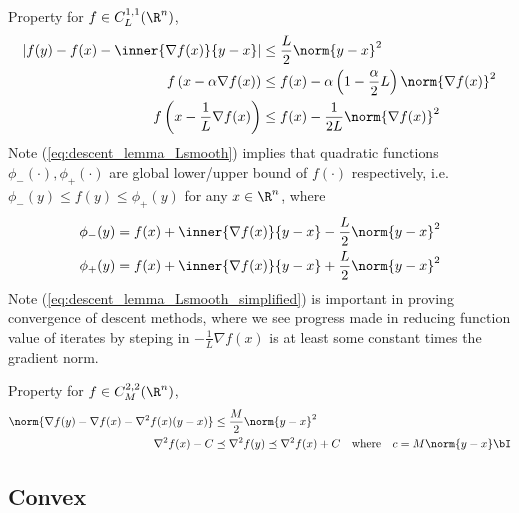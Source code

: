 \documentclass[../summary.tex]{subfiles}
\begin{document}
\noindent Property for $f\in C_L^{1,1}(\R^n)$, 
\begin{align}
    \left| 
        f(y) - f(x) - \inner{\nabla f(x)}{y-x}  \right|
        &\leq \frac{L}{2} \norm{y-x}^2
        \label{eq:descent_lemma_Lsmooth} \\
    f\left( x - \alpha \nabla f(x) \right)
        &\leq f(x) - \alpha\left( 1 - \frac{\alpha}{2}L\right) \norm{\nabla f(x)}^2 \\ 
    f\left( x - \frac{1}{L} \nabla f(x) \right)
        &\leq f(x) - \frac{1}{2L}\norm{\nabla f(x)}^2
        \label{eq:descent_lemma_Lsmooth_simplified}
\end{align}
Note (\ref{eq:descent_lemma_Lsmooth}) implies that quadratic functions $\phi_{-}(\cdot),\phi_+(\cdot)$ are global lower/upper bound of $f(\cdot)$ respectively, i.e. $\phi_{-}(y) \leq f(y) \leq \phi_+(y)$ for any $x\in\R^n$, where
\begin{align*}
    \phi_{-}(y)
        &= f(x) + \inner{\nabla f(x)}{y-x} - \frac{L}{2} \norm{y-x}^2 \\
    \phi_+(y)
        &= f(x) + \inner{\nabla f(x)}{y-x} + \frac{L}{2} \norm{y-x}^2
\end{align*} 
Note (\ref{eq:descent_lemma_Lsmooth_simplified}) is important in proving convergence of descent methods, where we see progress made in reducing function value of iterates by steping in $-\frac{1}{L}\nabla f(x)$ is at least some constant times the gradient norm.

\noindent Property for $f\in C_{M}^{2,2}(\R^n)$,
\begin{align}
    \norm{\nabla f(y) - \nabla f(x) - \nabla^2 f(x)(y-x)}
        &\leq \frac{M}{2} \norm{y-x}^2 \\
    \nabla^2 f(x) - C 
        &\preceq \nabla^2 f(y) 
        \preceq \nabla^2 f(x) + C
        \quad\text{where}\quad
        c = M\norm{y-x}\bI
\end{align}


\subsection{Convex}
\end{document}
